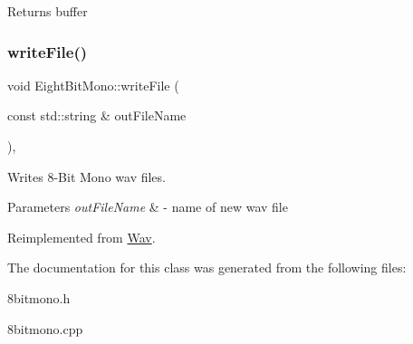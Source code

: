 \begin{DoxyReturn}{Returns}
buffer 
\end{DoxyReturn}
\mbox{\label{classEightBitMono_ae654eb1cc4fbb5586b33a73081cfb033}} 
\subsubsection{\texorpdfstring{write\+File()}{writeFile()}}
{\footnotesize\ttfamily void Eight\+Bit\+Mono\+::write\+File (\begin{DoxyParamCaption}\item[{const std\+::string \&}]{out\+File\+Name }\end{DoxyParamCaption})\hspace{0.3cm}{\ttfamily [override]}, {\ttfamily [virtual]}}

Writes 8-\/\+Bit Mono wav files.


\begin{DoxyParams}{Parameters}
{\em out\+File\+Name} & -\/ name of new wav file \\
\hline
\end{DoxyParams}


Reimplemented from \hyperlink{classWav_a7bae34f37288c53cb113e76045f78098}{Wav}.



The documentation for this class was generated from the following files\+:\begin{DoxyCompactItemize}
\item 
8bitmono.\+h\item 
8bitmono.\+cpp\end{DoxyCompactItemize}
